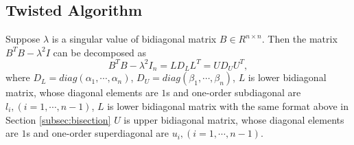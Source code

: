 \vspace{-0.1in}
\subsection{Twisted Algorithm}
\vspace{-0.1in}

Suppose $\lambda$ is a singular value of bidiagonal matrix $B \in R^{n \times n}$.
Then the matrix $B^T B - \lambda^2 I$ can be decomposed as
\begin{equation}
B^T B - \lambda^2 I_n = L D_L L^T = U D_U U^T ,
\end{equation}
where $D_L=diag(\alpha_1, \cdots, \alpha_n)$, $D_U = diag(\beta_1, \cdots, \beta_n)$, 
{\color{red}$L$ is lower bidiagonal matrix, whose diagonal elements are $1$s and one-order subdiagonal are $l_{i}, (i=1,\cdots,n-1)$, $L$ is lower bidiagonal matrix with the same format above in Section \ref{subsec:bisection}}
$U$ is upper bidiagonal matrix, whose diagonal elements are $1$s and one-order superdiagonal are $u_{i}, (i=1,\cdots,n-1)$. 

